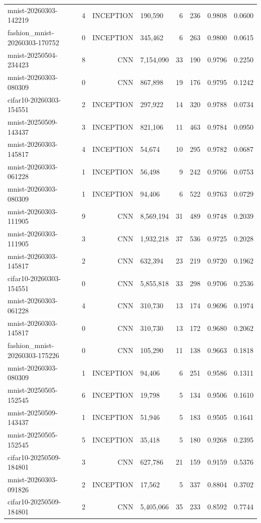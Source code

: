 \begin{tabular}{llrlrrrr}
mnist-20260303-142219 & 4 & INCEPTION & 190,590 & 6 & 236 & 0.9808 & 0.0600 \\
fashion_mnist-20260303-170752 & 0 & INCEPTION & 345,462 & 6 & 263 & 0.9800 & 0.0615 \\
mnist-20250504-234423 & 8 & CNN & 7,154,090 & 33 & 190 & 0.9796 & 0.2250 \\
mnist-20260303-080309 & 0 & CNN & 867,898 & 19 & 176 & 0.9795 & 0.1242 \\
cifar10-20260303-154551 & 2 & INCEPTION & 297,922 & 14 & 320 & 0.9788 & 0.0734 \\
mnist-20250509-143437 & 3 & INCEPTION & 821,106 & 11 & 463 & 0.9784 & 0.0950 \\
mnist-20260303-145817 & 4 & INCEPTION & 54,674 & 10 & 295 & 0.9782 & 0.0687 \\
mnist-20260303-061228 & 1 & INCEPTION & 56,498 & 9 & 242 & 0.9766 & 0.0753 \\
mnist-20260303-080309 & 1 & INCEPTION & 94,406 & 6 & 522 & 0.9763 & 0.0729 \\
mnist-20260303-111905 & 9 & CNN & 8,569,194 & 31 & 489 & 0.9748 & 0.2039 \\
mnist-20260303-111905 & 3 & CNN & 1,932,218 & 37 & 536 & 0.9725 & 0.2028 \\
mnist-20260303-145817 & 2 & CNN & 632,394 & 23 & 219 & 0.9720 & 0.1962 \\
cifar10-20260303-154551 & 0 & CNN & 5,855,818 & 33 & 298 & 0.9706 & 0.2536 \\
mnist-20260303-061228 & 4 & CNN & 310,730 & 13 & 174 & 0.9696 & 0.1974 \\
mnist-20260303-145817 & 0 & CNN & 310,730 & 13 & 172 & 0.9680 & 0.2062 \\
fashion_mnist-20260303-175226 & 0 & CNN & 105,290 & 11 & 138 & 0.9663 & 0.1818 \\
mnist-20260303-080309 & 1 & INCEPTION & 94,406 & 6 & 251 & 0.9586 & 0.1311 \\
mnist-20250505-152545 & 6 & INCEPTION & 19,798 & 5 & 134 & 0.9506 & 0.1610 \\
mnist-20250509-143437 & 1 & INCEPTION & 51,946 & 5 & 183 & 0.9505 & 0.1641 \\
mnist-20250505-152545 & 5 & INCEPTION & 35,418 & 5 & 180 & 0.9268 & 0.2395 \\
cifar10-20250509-184801 & 3 & CNN & 627,786 & 21 & 159 & 0.9159 & 0.5376 \\
mnist-20260303-091826 & 2 & INCEPTION & 17,562 & 5 & 337 & 0.8804 & 0.3702 \\
cifar10-20250509-184801 & 2 & CNN & 5,405,066 & 35 & 233 & 0.8592 & 0.7744 \\

\end{tabular}

